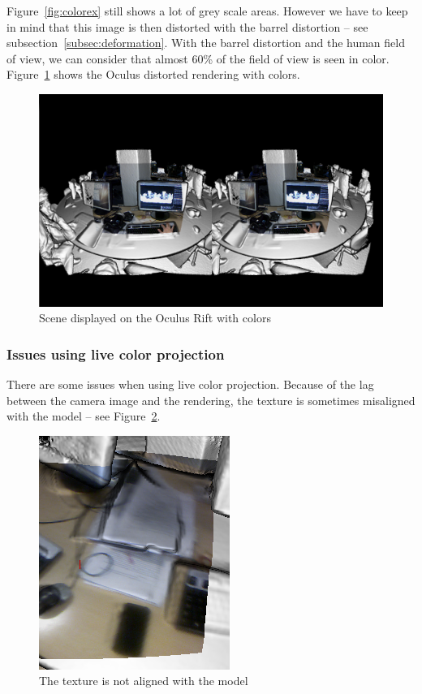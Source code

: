 \documentclass[12pt]{article}
\begin{document}
Figure~\ref{fig:colorex} still shows a lot of grey scale areas. However we have to keep in mind that this image is then distorted with the barrel distortion -- see subsection~\ref{subsec:deformation}. With the barrel distortion and the human field of view, we can consider that almost 60\% of the field of view is seen in color. Figure~\ref{fig:oculuscolor} shows the Oculus distorted rendering with colors.

\begin{figure}[!h]
  \centering
  \includegraphics[scale=0.3]{ColorRift.png}
  \caption{\label{fig:oculuscolor} Scene displayed on the Oculus Rift with colors}
\end{figure}

\subsubsection{Issues using live color projection}
There are some issues when using live color projection. Because of the lag between the camera image and the rendering, the texture is sometimes misaligned with the model -- see Figure~\ref{fig:texture}.

\begin{figure}[!h]
  \centering
  \includegraphics[scale=0.5]{TextureIssue.png}
  \caption{\label{fig:texture} The texture is not aligned with the model}
\end{figure}
\end{document}
